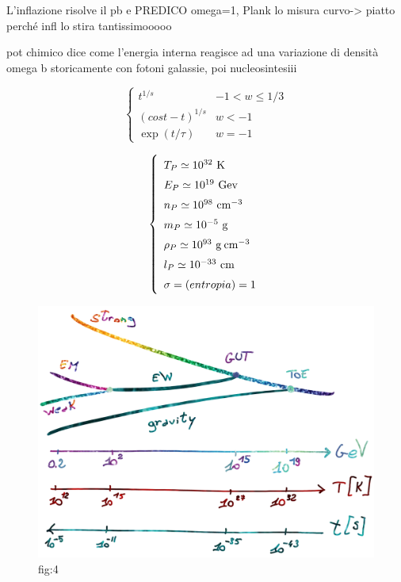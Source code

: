 L'inflazione risolve il pb e PREDICO omega=1, Plank lo misura
curvo-> piatto perché infl lo stira tantissimooooo

pot chimico dice come l'energia interna reagisce ad una variazione di densità
omega b storicamente con fotoni galassie, poi nucleosintesiii

\begin{equation}
    \left\{\begin{matrix}
        t^{1/s} & -1 < w \le 1/3\\ 
        (cost-t)^{1/s} & w<-1 \\
        \exp (t/\tau)&  w=-1
       \end{matrix}\right.
\end{equation}

\begin{equation}\left\{
    \def\arraystretch{1.5}
        \begin{array}{ll}
        T_P \simeq 10^{32}~\mathrm{K} \\
        E_P \simeq 10^{19}~\mathrm{Gev} \\
        n_P \simeq 10^{98}~\mathrm{cm}^{-3} \\
        m_P \simeq 10^{-5}~\mathrm{g} \\
        \rho_P \simeq 10^{93}~\mathrm{g\: cm}^{-3}  \\
        l_P \simeq 10^{-33}~\mathrm{cm} \\
        \sigma = (entropia) = 1 
    \end{array}\right. \label{eq:unitaplanckiane}
\end{equation}


\begin{figure}[H]
    \centering
    \includegraphics[width=.55 \textwidth]{Pictures/5/fasiprimordiali.png}
    \caption{fig:4}
\end{figure}

